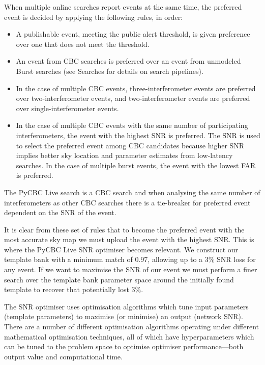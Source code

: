 When multiple online searches report events at the same time, the preferred event is decided by applying the following rules, in order:
%
\begin{itemize}
    \item A publishable event, meeting the public alert threshold, is given preference over one that does not meet the threshold.
    \item An event from CBC searches is preferred over an event from unmodeled Burst searches (see Searches for details on search pipelines).
    \item In the case of multiple CBC events, three-interferometer events are preferred over two-interferometer events, and two-interferometer events are preferred over single-interferometer events.
    \item In the case of multiple CBC events with the same number of participating interferometers, the event with the highest SNR is preferred. The SNR is used to select the preferred event among CBC candidates because higher SNR implies better sky location and parameter estimates from low-latency searches. In the case of multiple burst events, the event with the lowest FAR is preferred.
\end{itemize}
%
The PyCBC Live search is a CBC search and when analysing the same number of interferometers as other CBC searches there is a tie-breaker for preferred event dependent on the SNR of the event.

It is clear from these set of rules that to become the preferred event with the most accurate sky map we must upload the event with the highest SNR. This is where the PyCBC Live SNR optimiser becomes relevant. We construct our template bank with a minimum match of $0.97$, allowing up to a $3\%$ SNR loss for any event. If we want to maximise the SNR of our event we must perform a finer search over the template bank parameter space around the initially found template to recover that potentially lost $3\%$.

The SNR optimiser uses optimisation algorithms which tune input parameters (template parameters) to maximise (or minimise) an output (network SNR). There are a number of different optimisation algorithms operating under different mathematical optimisation techniques, all of which have hyperparameters which can be tuned to the problem space to optimise optimiser performance---both output value and computational time.

